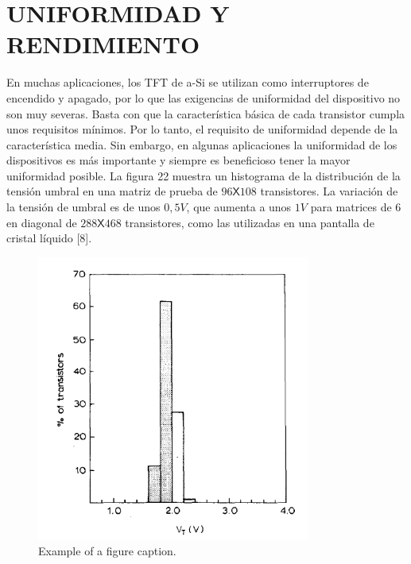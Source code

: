 \documentclass[conference]{IEEEtran}
\begin{document}
\section{UNIFORMIDAD Y RENDIMIENTO}

    En muchas aplicaciones, los TFT de a-Si se utilizan como interruptores de encendido y apagado, por 
    lo que las exigencias de uniformidad del dispositivo no son muy severas. Basta con que la 
    característica básica de cada transistor cumpla unos requisitos mínimos.
    Por lo tanto, el requisito de uniformidad depende de la característica media. Sin embargo, en algunas 
    aplicaciones la uniformidad de los dispositivos es más importante y siempre es beneficioso tener la 
    mayor uniformidad posible. La figura 22 muestra un histograma de la distribución de la tensión umbral 
    en una matriz de prueba de $96 \mathsf{X} 108$ transistores. La variación de la tensión de umbral es 
    de unos $0,5 V$, que aumenta a unos $1 V$ para matrices de $6$ en diagonal de $288 \mathsf{X} 468$ 
    transistores, como las utilizadas en una pantalla de cristal líquido [8].

\begin{figure}[htbp]
    \centerline{\includegraphics[width=9.0cm]{img/imagen-22.png}}
    \caption{Example of a figure caption.}%
    \label{fig22}
\end{figure} 
\end{document}
